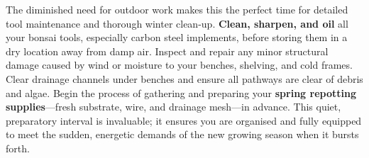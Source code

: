 \medskip
{}
\noindent
The diminished need for outdoor work makes this the perfect time for detailed tool maintenance and thorough winter clean\--up. 
\textbf{Clean, sharpen, and oil} all your bonsai tools, especially carbon steel implements, before storing them in a dry location away from damp air. 
Inspect and repair any minor structural damage caused by wind or moisture to your benches, shelving, and cold frames. 
Clear drainage channels under benches and ensure all pathways are clear of debris and algae. 
Begin the process of gathering and preparing your \textbf{spring repotting supplies}---fresh substrate, wire, and drainage mesh---in advance. 
This quiet, preparatory interval is invaluable; it ensures you are organised and fully equipped to meet the sudden, energetic demands of the new growing season when it bursts forth.
\closearticle
\columnbreak
